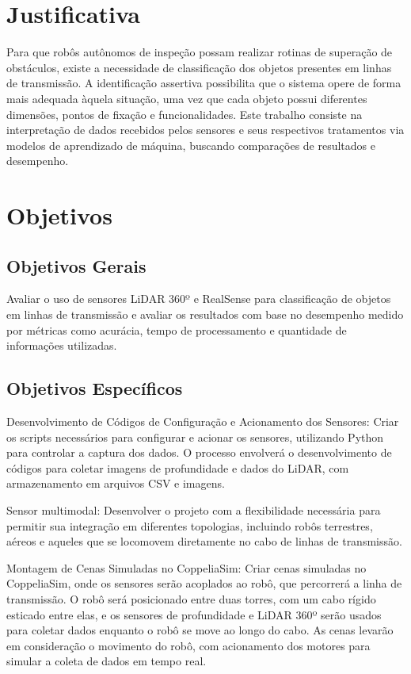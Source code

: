 \section{Justificativa}

Para que robôs autônomos de inspeção possam realizar rotinas de superação de obstáculos, existe a necessidade de classificação dos objetos presentes em linhas de transmissão. A identificação assertiva possibilita que o sistema opere de forma mais adequada àquela situação, uma vez que cada objeto possui diferentes dimensões, pontos de fixação e funcionalidades. Este trabalho consiste na interpretação de dados recebidos pelos sensores e seus respectivos tratamentos via modelos de aprendizado de máquina, buscando comparações de resultados e desempenho.

\section{Objetivos}
\subsection{Objetivos Gerais}

Avaliar o uso de sensores LiDAR 360º e RealSense para classificação de objetos em linhas de transmissão e avaliar os resultados com base no desempenho medido por métricas como acurácia, tempo de processamento e quantidade de informações utilizadas.

\subsection{Objetivos Específicos}

Desenvolvimento de Códigos de Configuração e Acionamento dos Sensores: Criar os scripts necessários para configurar e acionar os sensores, utilizando Python para controlar a captura dos dados. O processo envolverá o desenvolvimento de códigos para coletar imagens de profundidade e dados do LiDAR, com armazenamento em arquivos CSV e imagens.

Sensor multimodal: Desenvolver o projeto com a flexibilidade necessária para permitir sua integração em diferentes topologias, incluindo robôs terrestres, aéreos e aqueles que se locomovem diretamente no cabo de linhas de transmissão.

Montagem de Cenas Simuladas no CoppeliaSim: Criar cenas simuladas no CoppeliaSim, onde os sensores serão acoplados ao robô, que percorrerá a linha de transmissão. O robô será posicionado entre duas torres, com um cabo rígido esticado entre elas, e os sensores de profundidade e LiDAR 360º serão usados para coletar dados enquanto o robô se move ao longo do cabo. As cenas levarão em consideração o movimento do robô, com acionamento dos motores para simular a coleta de dados em tempo real.


